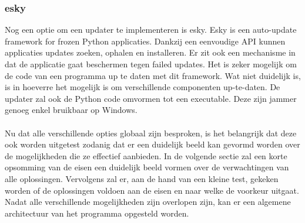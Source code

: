 \documentclass{article}
\begin{document}
\subsubsection{esky \citep{eskyMain}}
Nog een optie om een updater te implementeren is esky.
Esky is een auto-update framework for frozen Python applicaties.
Dankzij een eenvoudige API kunnen applicaties updates zoeken, ophalen en installeren.
Er zit ook een mechanisme in dat de applicatie gaat beschermen tegen failed updates.
Het is zeker mogelijk om de code van een programma up te daten met dit framework.
Wat niet duidelijk is, is in hoeverre het mogelijk is om verschillende componenten up-te-daten.
De updater zal ook de Python code omvormen tot een executable.
Deze zijn jammer genoeg enkel bruikbaar op Windows.

\paragraph{}
Nu dat alle verschillende opties globaal zijn besproken, is het belangrijk dat deze ook worden uitgetest zodanig dat er een duidelijk beeld kan gevormd worden over de mogelijkheden die ze effectief aanbieden.
In de volgende sectie zal een korte opsomming van de eisen een duidelijk beeld vormen over de verwachtingen van alle oplossingen.
Vervolgens zal er, aan de hand van een kleine test, gekeken worden of de oplossingen voldoen aan de eisen en naar welke de voorkeur uitgaat.
Nadat alle verschillende mogelijkheden zijn overlopen zijn, kan er een algemene architectuur van het programma opgesteld worden.
\end{document}
